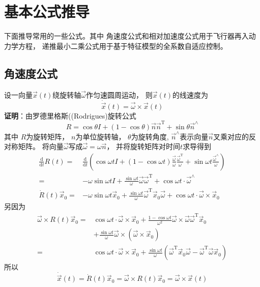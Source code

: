 \section{基本公式推导}
下面推导常用的一些公式。其中
角速度公式和相对加速度公式用于飞行器再入动力学方程，
递推最小二乘公式用于基于特征模型的全系数自适应控制\cite{mhongxin1990}。

\subsection{角速度公式}
设一向量$\vec{x}(t)$绕旋转轴$\vec{\omega}$作匀速圆周运动，
则$\vec{x}(t)$的线速度为
\[\dot{\vec{x}}(t)=\vec{\omega}\times\vec{x}(t)\]
\textbf{证明}：由罗德里格斯((Rodrigues)旋转公式
\[R=\cos\theta I+(1-\cos\theta)\vec{n}\vec{n}^\text{T}+\sin\theta\vec{n}^{\wedge}\]
其中
$R$为旋转矩阵，
$n$为单位旋转轴，
$\theta$为旋转角度,
$\vec{n}^{\wedge}$表示向量$\vec{n}$叉乘对应的反对称矩阵。
将向量$\vec{\omega}$写成$\vec{\omega}=\omega\vec{n}$，
并将旋转矩阵对时间$t$求导得到
\begin{align*}
    \frac{\text{d}}{\text{d}t}R(t)
    =& \frac{\text{d}}{\text{d}t}\left(
        \cos\omega t I
        +(1-\cos\omega t)\frac{\vec{\omega}}{\omega}\frac{\vec{\omega}^\text{T}}{\omega}
        +\sin\omega t\frac{\vec{\omega}^{\wedge}}{\omega}
    \right) \\
    =& -\omega\sin\omega tI
        +\frac{\sin\omega t}{\omega}\vec{\omega}\vec{\omega}^\text{T}
        +\cos\omega t\cdot\vec{\omega}^{\wedge} \\
    \dot{R}(t)\vec{x}_0
    =& -\omega\sin\omega t\vec{x}_0
        +\frac{\sin\omega t}{\omega}\vec{\omega}^\text{T}\vec{x}_0\vec{\omega}
        +\cos\omega t\cdot\vec{\omega}\times\vec{x}_0
\end{align*}
另因为
\begin{align*}
    \vec{\omega}\times R(t)\vec{x}_0
    =& \cos\omega t\cdot\vec{\omega}\times\vec{x}_0
        +\frac{1-\cos\omega t}{\omega^2}\vec{\omega}\times\vec{\omega}\vec{\omega}^\text{T}\vec{x}_0 \\
        &+ \frac{\sin\omega t}{\omega}\vec{\omega}\times(\vec{\omega}\times\vec{x}_0) \\
    =& \cos\omega t\cdot\vec{\omega}\times\vec{x}_0
        +\frac{\sin\omega t}{\omega}(\vec{\omega}^\text{T}\vec{x}_0\vec{\omega}
        -\vec{\omega}^\text{T}\vec{\omega}\vec{x}_0)
\end{align*}
所以
\[\dot{\vec{x}}(t)=\dot{R}(t)\vec{x}_0=\vec{\omega}\times R(t)\vec{x}_0=\vec{\omega}\times\vec{x}(t)\]

